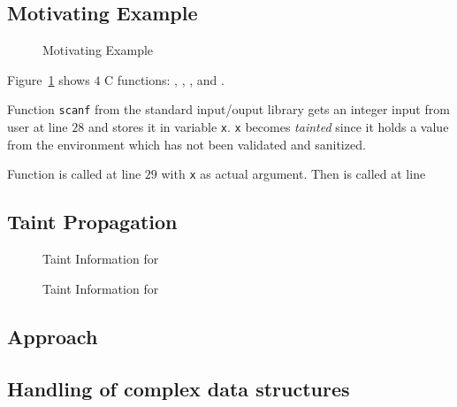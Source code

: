 \subsection{Motivating Example}\label{example} 

\begin{figure}[!h]
\begin{center}
\end{center}
\caption{Motivating Example}
\label{fig:sample}
\end{figure}

Figure~\ref{fig:sample} shows $4$ C functions:
\main, \even, \odd, and \compute.

Function \texttt{scanf} from the standard input/ouput
library gets an integer input from user at line $28$
and stores it in variable \texttt{x}. \texttt{x} 
becomes \textit{tainted} since it holds a value from
the environment which has not been validated and
sanitized.

Function \even{} is called at line $29$ with \texttt{x}
as actual argument. Then \odd{} is called at line 

\subsection{Taint Propagation}\label{analysis:propagation}

\begin{figure}
\begin{minipage}[b]{0.45\textwidth}
	\caption{Taint Information for \main{}}\label{fig:taintmain}
	\end{minipage}		
	\begin{minipage}[b]{0.45\textwidth}
	\caption{Taint Information for \compute{}}\label{fig:taintcompute}
	\end{minipage}			
\end{figure}


\subsection{Approach}\label{approach} 


\subsection{Handling of complex data structures}
